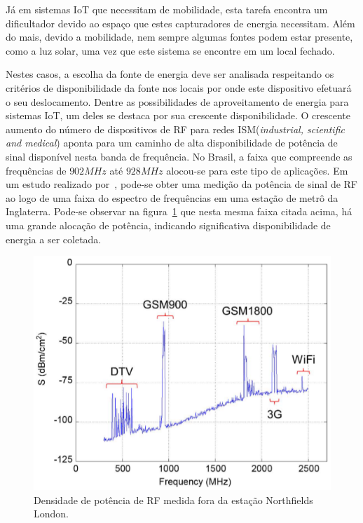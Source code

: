 Já em sistemas IoT que necessitam de mobilidade, esta tarefa encontra um dificultador devido ao espaço que estes capturadores de energia necessitam. Além do mais, devido a mobilidade, nem sempre algumas fontes podem estar presente, como a luz solar, uma vez que este sistema se encontre em um local fechado. 

Nestes casos, a escolha da fonte de energia deve ser analisada respeitando os critérios de disponibilidade da fonte nos locais por onde este dispositivo efetuará o seu deslocamento. Dentre as possibilidades de aproveitamento de energia para sistemas IoT, um deles se destaca por sua crescente disponibilidade. O crescente aumento do número de dispositivos de RF para redes ISM(\textit{industrial, scientific and medical}) aponta para um caminho de alta disponibilidade de potência de sinal disponível nesta banda de frequência. No Brasil, a faixa que compreende as frequências de $902MHz$ até $928MHz$ alocou-se para este tipo de aplicações. Em um estudo realizado por~, pode-se obter uma medição da potência de sinal de RF ao logo de uma faixa do espectro de frequências em uma estação de metrô da Inglaterra. Pode-se observar na figura~\ref{fig:espectro} que nesta mesma faixa citada acima, há uma grande alocação de potência, indicando significativa disponibilidade de energia a ser coletada.

\begin{figure}
  \caption{Densidade de potência de RF medida fora da estação Northfields London.}
  \begin{center}
      \includegraphics[scale=0.4]{img/espectro.png}
  \end{center}
  \label{fig:espectro}
\end{figure}
